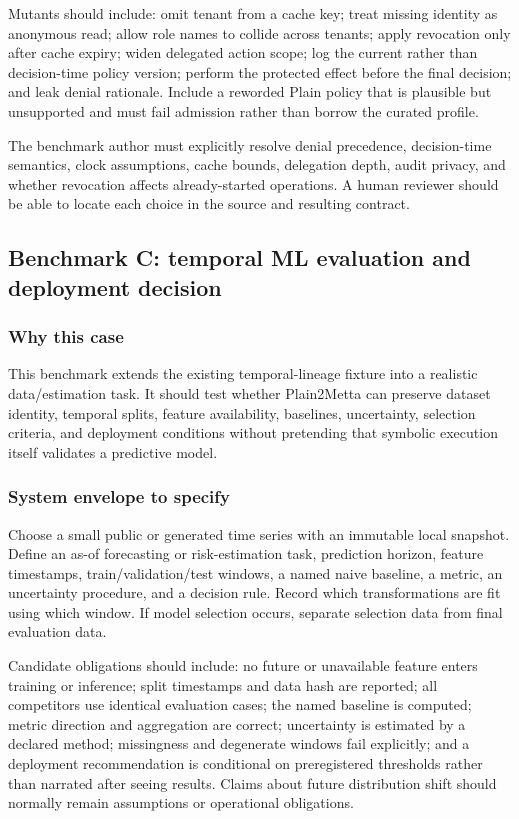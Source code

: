 \documentclass[11pt]{article}
\begin{document}
Mutants should include: omit tenant from a cache key; treat missing identity as
anonymous read; allow role names to collide across tenants; apply revocation
only after cache expiry; widen delegated action scope; log the current rather
than decision-time policy version; perform the protected effect before the
final decision; and leak denial rationale.  Include a reworded Plain policy
that is plausible but unsupported and must fail admission rather than borrow
the curated profile.

The benchmark author must explicitly resolve denial precedence, decision-time
semantics, clock assumptions, cache bounds, delegation depth, audit privacy,
and whether revocation affects already-started operations.  A human reviewer
should be able to locate each choice in the source and resulting contract.

\subsection{Benchmark C: temporal ML evaluation and deployment decision}

\subsubsection*{Why this case}

This benchmark extends the existing temporal-lineage fixture into a realistic
data/estimation task.  It should test whether Plain2Metta can preserve dataset
identity, temporal splits, feature availability, baselines, uncertainty,
selection criteria, and deployment conditions without pretending that
symbolic execution itself validates a predictive model.

\subsubsection*{System envelope to specify}

Choose a small public or generated time series with an immutable local
snapshot.  Define an as-of forecasting or risk-estimation task, prediction
horizon, feature timestamps, train/validation/test windows, a named naive
baseline, a metric, an uncertainty procedure, and a decision rule.  Record
which transformations are fit using which window.  If model selection occurs,
separate selection data from final evaluation data.

Candidate obligations should include: no future or unavailable feature enters
training or inference; split timestamps and data hash are reported; all
competitors use identical evaluation cases; the named baseline is computed;
metric direction and aggregation are correct; uncertainty is estimated by a
declared method; missingness and degenerate windows fail explicitly; and a
deployment recommendation is conditional on preregistered thresholds rather
than narrated after seeing results.  Claims about future distribution shift
should normally remain assumptions or operational obligations.
\end{document}
